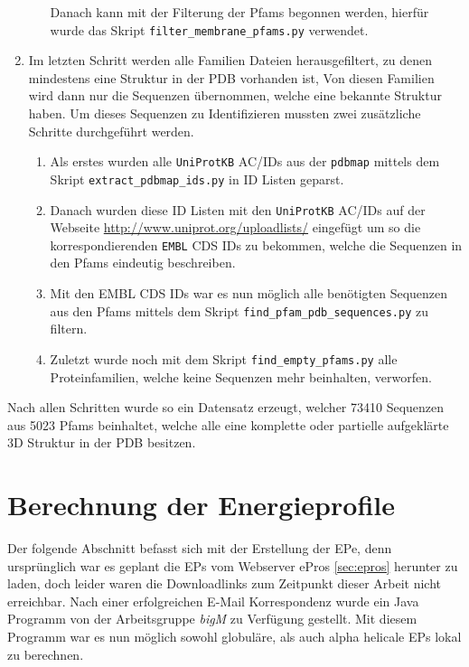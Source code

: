 \begin{enumerate}
\begin{enumerate}
        Danach kann mit der Filterung der \ac{Pfams} begonnen werden, hierfür wurde das Skript \texttt{filter\_membrane\_pfams.py} verwendet.
    \end{enumerate}
\item
    Im letzten Schritt werden alle Familien Dateien herausgefiltert, zu denen mindestens eine Struktur in der \ac{PDB} vorhanden ist, Von diesen Familien wird dann nur die Sequenzen übernommen, welche eine bekannte Struktur haben. Um dieses Sequenzen zu Identifizieren mussten zwei zusätzliche Schritte durchgeführt werden.
    \begin{enumerate}
        \item
        Als erstes wurden alle \texttt{UniProtKB} AC/IDs aus der \texttt{pdbmap} mittels dem Skript \texttt{extract\_pdbmap\_ids.py} in ID Listen geparst. 
        \item
        Danach wurden diese ID Listen mit den \texttt{UniProtKB} AC/IDs auf der Webseite \url{http://www.uniprot.org/uploadlists/} eingefügt um so die korrespondierenden \texttt{EMBL} CDS IDs zu bekommen, welche die Sequenzen in den Pfams eindeutig beschreiben.
        \item
        Mit den EMBL CDS IDs war es nun möglich alle benötigten Sequenzen aus den Pfams mittels dem Skript \texttt{find\-\_pfam\-\_pdb\-\_sequences.py} zu filtern.
        \item
        Zuletzt wurde noch mit dem Skript \texttt{find\-\_empty\-\_pfams.py} alle Proteinfamilien, welche keine Sequenzen mehr beinhalten, verworfen. 
    \end{enumerate}
\end{enumerate}

Nach allen Schritten wurde so ein Datensatz erzeugt, welcher 73410 Sequenzen aus 5023 \ac{Pfams} beinhaltet, welche alle eine komplette oder partielle aufgeklärte 3D Struktur in der \ac{PDB} besitzen.




\section{Berechnung der Energieprofile}
\label{sec:calc_ep}
Der folgende Abschnitt befasst sich mit der Erstellung der \acf{EP}e, denn ursprünglich war es geplant die \ac{EP}s vom Webserver ePros \ref{sec:epros} herunter zu laden, doch leider waren die Downloadlinks zum Zeitpunkt dieser Arbeit nicht erreichbar. Nach einer erfolgreichen E-Mail Korrespondenz wurde ein Java Programm von der Arbeitsgruppe \emph{bigM} zu Verfügung gestellt. Mit diesem Programm war es nun möglich sowohl globuläre, als auch alpha helicale \ac{EP}s  lokal zu berechnen. 

